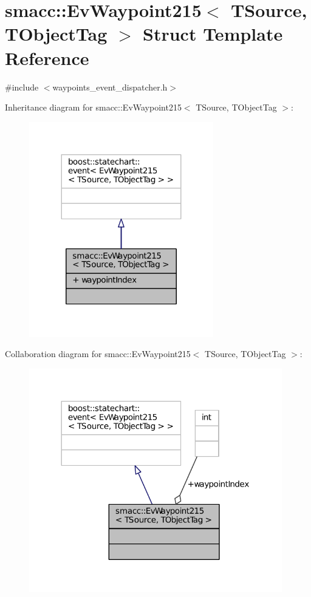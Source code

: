 \hypertarget{structsmacc_1_1EvWaypoint215}{}\section{smacc\+:\+:Ev\+Waypoint215$<$ T\+Source, T\+Object\+Tag $>$ Struct Template Reference}
\label{structsmacc_1_1EvWaypoint215}


{\ttfamily \#include $<$waypoints\+\_\+event\+\_\+dispatcher.\+h$>$}



Inheritance diagram for smacc\+:\+:Ev\+Waypoint215$<$ T\+Source, T\+Object\+Tag $>$\+:
\nopagebreak
\begin{figure}[H]
\begin{center}
\leavevmode
\includegraphics[width=227pt]{structsmacc_1_1EvWaypoint215__inherit__graph}
\end{center}
\end{figure}


Collaboration diagram for smacc\+:\+:Ev\+Waypoint215$<$ T\+Source, T\+Object\+Tag $>$\+:
\nopagebreak
\begin{figure}[H]
\begin{center}
\leavevmode
\includegraphics[width=312pt]{structsmacc_1_1EvWaypoint215__coll__graph}
\end{center}
\end{figure}
